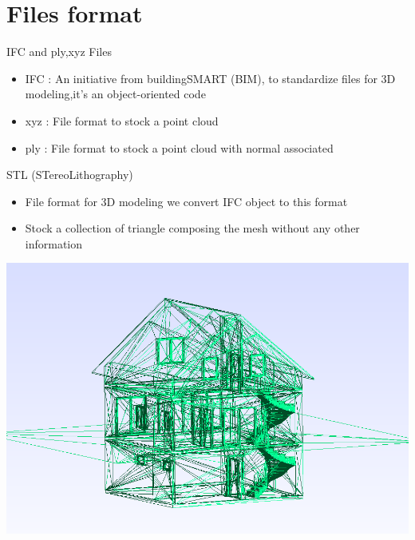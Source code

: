 \documentclass[10pt]{beamer}
\begin{document}
\section{Files format}
\begin{frame}{IFC and ply,xyz Files}
\begin{itemize}
    \item IFC : An initiative from buildingSMART (BIM), to standardize files for 3D modeling,it's an object-oriented code 
    \item xyz : File format to stock a point cloud
    \item ply : File format to stock a point cloud with normal associated
\end{itemize}


\end{frame}
\begin{frame}{STL (STereoLithography)}
    \begin{itemize}
        \item File format for 3D modeling we convert IFC object to this format
        \item Stock a collection of triangle composing the mesh without any other information
    \end{itemize}
    \begin{center}
        \includegraphics[scale=0.3]{../../images/ACJASMINSTL.png}
    \end{center}
    
\end{frame}
\end{document}
